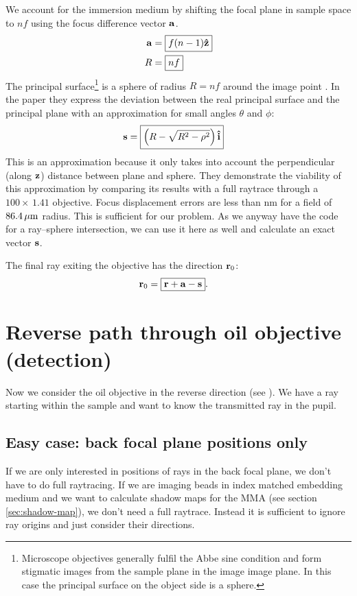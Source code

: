 We account for the immersion medium by shifting the focal plane in
sample space to $nf$ using the focus difference vector $\mathbf{a}$.
\begin{align}
  \mathbf{a} &= \boxed{f (n-1) \mathbf{\hat{z}}} \\
  R &= \boxed{nf}
\end{align}
The principal surface\footnote{Microscope objectives generally fulfil
  the Abbe sine condition and form stigmatic images from the sample
  plane in the image image plane. In this case the principal surface
  on the object side is a sphere.} is a sphere of radius $R=nf$ around
the image point \citetext{\citealt[p.~22]{Smith2000} and
  \citealt{Botcherby2008}}. In the paper \citet{Hwang2008} they
express the deviation between the real principal surface and the
principal plane with an approximation for small angles $\theta$ and
$\phi$:
\begin{align}
  \mathbf{s} &= \boxed{\left(R - \sqrt{R^2-\rho^2}\right)\mathbf{\hat{i}}}
\end{align}
This is an approximation because it only takes into account the
perpendicular (along $\mathbf{z}$) distance between plane and sphere. They
demonstrate the viability of this approximation by comparing its
results with a full raytrace through a $100\times\,1.41$
objective. Focus displacement errors are less than \unit[130]{nm} for
a field of $\unit[86.4]{\mu m}$ radius. This is sufficient for our
problem. As we anyway have the code for a ray--sphere intersection, we
can use it here as well and calculate an exact vector $\mathbf{s}$.

The final ray exiting the objective has the direction $\mathbf{r}_0$:
\begin{align}
  \mathbf{r}_0 &= \boxed{\mathbf{r} + \mathbf{a} - \mathbf{s}}.
\end{align}
\section{Reverse path through oil objective (detection)}
Now we consider the oil objective in the reverse direction (see
). We have a ray starting within the sample
and want to know the transmitted ray in the pupil.

\subsection{Easy case: back focal plane positions only}
If we are only interested in positions of rays in the back focal
plane, we don't have to do full raytracing. If we are imaging beads in
index matched embedding medium and we want to calculate shadow maps
for the MMA (see section \ref{sec:shadow-map}), we don't need a full
raytrace. Instead it is sufficient to ignore ray origins and just
consider their directions.

